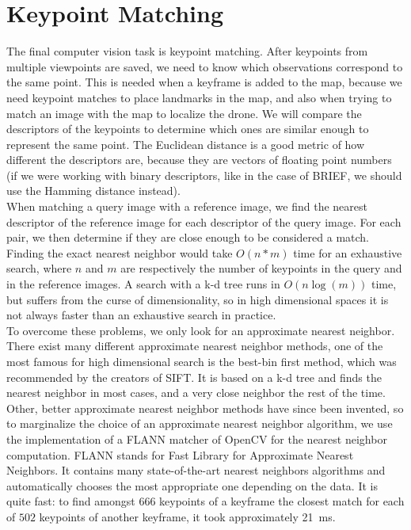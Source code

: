 \section{Keypoint Matching}
The final computer vision task is keypoint matching. After keypoints from multiple viewpoints are saved, we need to know which observations correspond to the same point. This is needed when a keyframe is added to the map, because we need keypoint matches to place landmarks in the map, and also when trying to match an image with the map to localize the drone. We will compare the descriptors of the keypoints to determine which ones are similar enough to represent the same point. The Euclidean distance is a good metric of how different the descriptors are, because they are vectors of floating point numbers (if we were working with binary descriptors, like in the case of BRIEF, we should use the Hamming distance instead).\\

When matching a query image with a reference image, we find the nearest descriptor of the reference image for each descriptor of the query image. For each pair, we then determine if they are close enough to be considered a match. Finding the exact nearest neighbor would take $O(n*m)$ time for an exhaustive search, where $n$ and $m$ are respectively the number of keypoints in the query and in the reference images. A search with a k-d tree runs in $O(n\log(m))$ time, but suffers from the curse of dimensionality, so in high dimensional spaces it is not always faster than an exhaustive search in practice.\\

To overcome these problems, we only look for an approximate nearest neighbor. There exist many different approximate nearest neighbor methods, one of the most famous for high dimensional search is the best-bin first method, which was recommended by the creators of SIFT. It is based on a k-d tree and finds the nearest neighbor in most cases, and a very close neighbor the rest of the time. Other, better approximate nearest neighbor methods have since been invented, so to marginalize the choice of an approximate nearest neighbor algorithm, we use the implementation of a FLANN matcher of OpenCV for the nearest neighbor computation. FLANN stands for Fast Library for Approximate Nearest Neighbors. It contains many state-of-the-art nearest neighbors algorithms and automatically chooses the most appropriate one depending on the data. It is quite fast: to find amongst $666$ keypoints of a keyframe the closest match for each of $502$ keypoints of another keyframe, it took approximately \SI{21}{\milli\second}.

